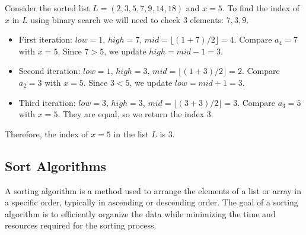 \begin{eg}
    Consider the sorted list $L = (2, 3, 5, 7, 9, 14, 18)$ and $x = 5$. To find the index of $x$ in $L$ using binary search we will need to check $3$ elements: $7, 3, 9$.
    \begin{itemize}[itemsep=1pt,label=$\circ$]
        \item First iteration: $low = 1$, $high = 7$, $mid = \lfloor (1 + 7) / 2 \rfloor = 4$. Compare $a_4 = 7$ with $x = 5$. Since $7 > 5$, we update $high = mid - 1 = 3$.
        \item Second iteration: $low = 1$, $high = 3$, $mid = \lfloor (1 + 3) / 2 \rfloor = 2$. Compare $a_2 = 3$ with $x = 5$. Since $3 < 5$, we update $low = mid + 1 = 3$.
        \item Third iteration: $low = 3$, $high = 3$, $mid = \lfloor (3 + 3) / 2 \rfloor = 3$. Compare $a_3 = 5$ with $x = 5$. They are equal, so we return the index $3$.
    \end{itemize}
    Therefore, the index of $x = 5$ in the list $L$ is $3$.
\end{eg}


\subsection{Sort Algorithms}
\begin{definition}
    A sorting algorithm is a method used to arrange the elements of a list or array in a specific order, typically in ascending or descending order. The goal of a sorting algorithm is to efficiently organize the data while minimizing the time and resources required for the sorting process.
\end{definition}

